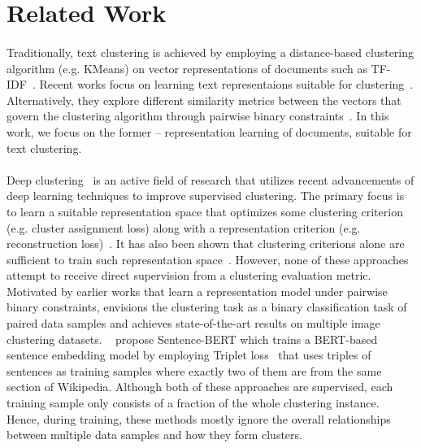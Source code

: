 \documentclass[11pt,a4paper]{article}
\begin{document}
\section{Related Work}
\paragraph{}Traditionally, text clustering is achieved by employing a distance-based clustering algorithm (e.g. KMeans) on vector representations of documents such as TF-IDF~\citep{jones1972statistical}. Recent works focus on learning text representaions suitable for clustering~\citep{chen2017improved,xu2017self,hadifar2019self}. Alternatively, they explore different similarity metrics between the vectors that govern the clustering algorithm through pairwise binary constraints~\citep{basu2002semi,kulis2009semi}. In this work, we focus on the former -- representation learning of documents, suitable for text clustering.

\paragraph{}Deep clustering~\citep{min2018survey} is an active field of research that utilizes recent advancements of deep learning techniques to improve supervised clustering. The primary focus is to learn a suitable representation space that optimizes some clustering criterion (e.g. cluster assignment loss) along with a representation criterion (e.g. reconstruction loss)~\citep{xie2016unsupervised,li2018discriminatively,ghasedi2017deep,jiang2016variational}. It has also been shown that clustering criterions alone are sufficient to train such representation space~\citep{yang2016joint}. However, none of these approaches attempt to receive direct supervision from a clustering evaluation metric. Motivated by earlier works that learn a representation model under pairwise binary constraints, \citet{chang2017deep} envisions the clustering task as a binary classification task of paired data samples and achieves state-of-the-art results on multiple image clustering datasets. ~\citet{reimers2019sentence} propose Sentence-BERT which trains a BERT-based sentence embedding model by employing Triplet loss~\citep{dor2018learning} that uses triples of sentences as training samples where exactly two of them are from the same section of Wikipedia. Although both of these approaches are supervised, each training sample only consists of a fraction of the whole clustering instance. Hence, during training, these methods mostly ignore the overall relationships between multiple data samples and how they form clusters.
\end{document}
